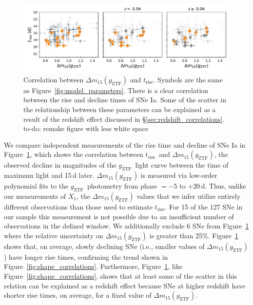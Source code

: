 \documentclass[twocolumn]{./aastex63}
\newcommand{\todo}[1]{{\color{magenta} to-do: {#1}}}
\newcommand{\gztf}{$g_\mathrm{ZTF}$}
\newcommand{\trise}{$t_\mathrm{rise}$}
\begin{document}
\begin{figure}
    \centering
    \includegraphics[width=6in]{./figures/dm15_rise.pdf}
    \caption{Correlation between $\Delta m_{15}(g_\mathrm{ZTF})$ and \trise.
    Symbols are the same as Figure~\ref{fig:model_parameters}. There is a clear
    correlation between the rise and decline times of SNe Ia. Some of the
    scatter in the relationship between these parameters can be explained as a
    result of the redshift effect discussed in
    \S\ref{sec:redshift_correlations}. \todo{remake figure with less white
    space}}
    \label{fig:dm15}
\end{figure}

We compare independent measurements of the rise time and decline of SNe Ia in
Figure~\ref{fig:dm15}, which shows the correlation between \trise\ and $\Delta
m_{15}(g_\mathrm{ZTF})$, the observed decline in magnitudes of the \gztf\ light
curve between the time of maximum light and 15\,d later. $\Delta
m_{15}(g_\mathrm{ZTF})$ is measured via low-order polynomial fits to the \gztf\
photometry from phase $= -5$ to $+20$\,d. Thus, unlike our measurements of
$X_1$, the $\Delta m_{15}(g_\mathrm{ZTF})$ values that we infer utilize entirely
different observations than those used to estimate \trise. For 15 of the 127 SNe
in our sample this measurement is not possible due to an insufficient number of
observations in the defined window. We additionally exclude 6 SNe from
Figure~\ref{fig:dm15} where the relative uncertainty on $\Delta
m_{15}(g_\mathrm{ZTF})$ is greater than 25\%. Figure~\ref{fig:dm15} shows that,
on average, slowly declining SNe (i.e., smaller values of $\Delta
m_{15}(g_\mathrm{ZTF})$) have longer rise times, confirming the trend shown in
Figure~\ref{fig:shape_correlations}. Furthermore, Figure~\ref{fig:dm15}, like
Figure~\ref{fig:shape_correlations}, shows that at least some of the scatter in
this relation can be explained as a redshift effect because SNe at higher
redshift have shorter rise times, on average, for a fixed value of $\Delta
m_{15}(g_\mathrm{ZTF})$.
\end{document}

